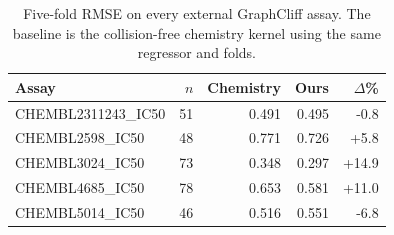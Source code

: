 \begin{table}[t]
\centering
\caption{Five-fold RMSE on every external GraphCliff assay. The baseline is the collision-free chemistry kernel using the same regressor and folds.}
\label{tab:external_all}
\scriptsize
\begin{tabular}{lrrrr}
\toprule
Assay & $n$ & Chemistry & Ours & $\Delta$\%\\
\midrule
CHEMBL2311243\_IC50 & 51 & 0.491 & 0.495 & -0.8\\
CHEMBL2598\_IC50 & 48 & 0.771 & 0.726 & +5.8\\
CHEMBL3024\_IC50 & 73 & 0.348 & 0.297 & +14.9\\
CHEMBL4685\_IC50 & 78 & 0.653 & 0.581 & +11.0\\
CHEMBL5014\_IC50 & 46 & 0.516 & 0.551 & -6.8\\
\bottomrule
\end{tabular}
\end{table}
